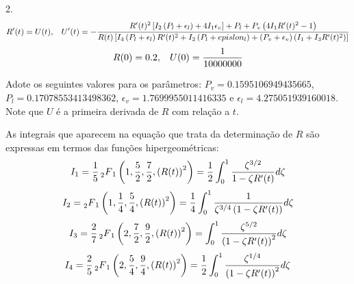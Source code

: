 \documentclass[10pt,a4paper]{article}
\newcommand{\prt}[1]{\left(#1\right)}
\newcommand{\col}[1]{\left[#1\right]}
\newcommand{\hgf}[4]{\prescript{}{2}{F}_1\left(#1,#2,#3,#4\right)}
\begin{document}
	2. \[R'(t)=U(t), \hspace{0.3cm} U'(t)=-\frac{R'(t)^2\col{I_2\prt{P_l+\epsilon_l} + 4I_1\epsilon_v}+P_l+P_v\prt{4I_1R'(t)^2-1}}{R(t)\col{I_4\prt{P_l+\epsilon_l}R'(t)^2+I_2\prt{P_l+epislon_l}+\prt{P_v+\epsilon_v}\prt{I_1+I_3R'(t)^2}}}\]
	\[R(0)=0.2, \hspace{.3cm} U(0)=\frac{1}{10000000}\]
	
	Adote os seguintes valores para os parâmetros: $P_v=0.1595106949435665$, $P_l=0.17078553413498362$, $\epsilon_v=1.7699955011416335$ e $\epsilon_l=4.275051939160018$. Note que $U$ é a primeira derivada de $R$ com relação a $t$.
	
	As integrais que aparecem na equação que trata da determinação de $R$ são expressas em termos das funções hipergeométricas:
	\[I_1=\frac{1}{5} \hgf{1}{\frac{5}{2}}{\frac{7}{2}}{\prt{R(t)}^2} = \frac{1}{2}\int_0^1{\frac{\zeta^{3/2}}{1-\zeta R'(t)}d\zeta}\]
	\[I_2=\hgf{1}{\frac{1}{4}}{\frac{5}{4}}{\prt{R(t)}^2} = \frac{1}{4}\int_0^1{\frac{1}{\zeta^{3/4}\prt{1-\zeta R'(t)}}d\zeta}\]
	\[I_3=\frac{2}{7}\hgf{2}{\frac{7}{2}}{\frac{9}{2}}{\prt{R(t)}^2} = \int_0^1{\frac{\zeta^{5/2}}{\prt{1-\zeta R'(t)}^2}d\zeta}\]
	\[I_4=\frac{2}{5}\hgf{2}{\frac{5}{4}}{\frac{9}{4}}{\prt{R(t)}^2} = \frac{1}{2}\int_0^1{\frac{\zeta^{1/4}}{\prt{1-\zeta R'(t)}^2}d\zeta}\]
	
\end{document}
